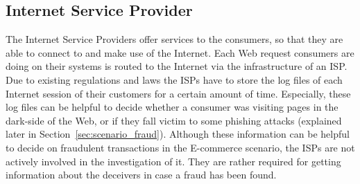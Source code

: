 
\subsection{Internet Service Provider}
\label{subsec:stakeholder_isp}

The Internet Service Providers offer services to the consumers, so that they are able to connect to and make use of the Internet. Each Web request consumers are doing on their systems is routed to the Internet via the infrastructure of an \gls{ISP}. Due to existing regulations and laws the \gls{ISP}s have to store the log files of each Internet session of their customers for a certain amount of time. Especially, these log files can be helpful to decide whether a consumer was visiting pages in the dark-side of the Web, or if they fall victim to some phishing attacks (explained later in Section~\ref{sec:scenario_fraud}). Although these information can be helpful to decide on fraudulent transactions in the \gls{E-commerce} scenario, the \gls{ISP}s are not actively involved in the investigation of it. They are rather required for getting information about the deceivers in case a fraud has been found.


